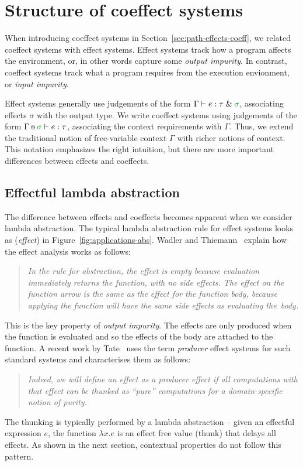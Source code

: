 \section{Structure of coeffect systems}
\label{sec:applications-structure}

When introducing coeffect systems in Section~\ref{sec:path-effects-coeff}, we related coeffect systems
with effect systems. Effect systems track how a program affects the environment, or, in other words 
capture some \emph{output impurity}. In contrast, coeffect systems track what a program requires from 
the execution envionment, or \emph{input impurity}.

Effect systems generally use judgements of the form $\Gamma \vdash e : \tau \;\&\; \cclrd{\sigma}$, 
associating effects $\sigma$ with the output type. We write coeffect 
systems using judgements of the form $\coctx{\Gamma}{\cclrd{\sigma}} \vdash e : \tau$, associating
the context requirements with $\Gamma$. Thus, we extend the traditional notion of free-variable
context $\Gamma$ with richer notions of context. This notation emphasizes the right intuition, 
but there are more important differences between effects and coeffects.


\subsection{Effectful lambda abstraction}
\label{sec:applications-structure-lam}

The difference between effects and coeffects becomes apparent when we consider lambda abstraction.
The typical lambda abstraction rule for effect systems looks as (\emph{effect}) in 
Figure~\ref{fig:applications-abs}. Wadler and Thiemann~\cite{monads-effects-marriage} explain how 
the effect analysis works as follows:
%
\begin{quote}
\emph{In the rule for abstraction, the effect is empty because evaluation immediately
returns the function, with no side effects. The effect on the function arrow
is the same as the effect for the function body, because applying the function will
have the same side effects as evaluating the~body.}
\end{quote}
%
This is the key property of \emph{output impurity}. The effects are only produced when the
function is evaluated and so the effects of the body are attached to the function. A recent
work by Tate~\cite{effects-producer-semantics} uses the term \emph{producer} effect systems
for such standard systems and characterises them as follows:
%
\begin{quote}
\emph{Indeed, we will define an effect as a producer effect if all computations with that 
effect can be thunked as ``pure'' computations for a domain-specific notion of purity.}
\end{quote} 
%
The thunking is typically performed by a lambda abstraction -- given an effectful expression 
$e$, the function $\lambda x.e$ is an effect free value (thunk) that delays all effects.
As shown in the next section, contextual properties do not follow this pattern.


